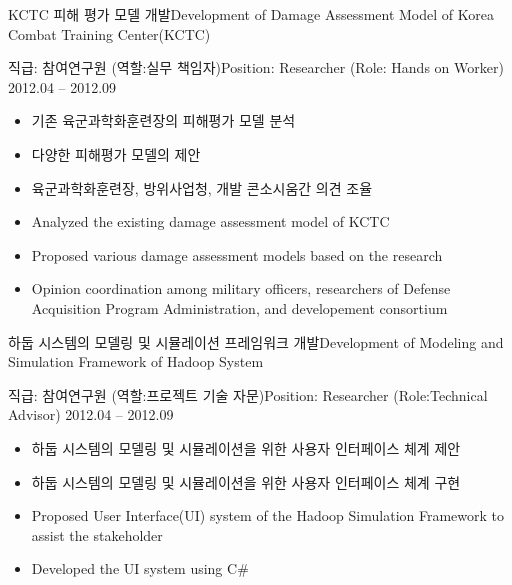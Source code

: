 \documentclass[english,representative]{resume_structure}
\begin{document}
\begin{Project}
{KCTC 피해 평가 모델 개발}{Development of Damage Assessment Model of Korea Combat Training Center(KCTC)}
{}{} 
{
\ResumeSubSection %
    {직급: 참여연구원 (역할:실무 책임자)}{Position: Researcher (Role: Hands on Worker)}
    {2012.04 -- 2012.09}
    {
      \begin{itemize}
        \item 기존 육군과학화훈련장의 피해평가 모델 분석
        \item 다양한 피해평가 모델의 제안
        \item 육군과학화훈련장, 방위사업청, 개발 콘소시움간 의견 조율
      \end{itemize}
    }
    {
      \begin{itemize}
        \item Analyzed the existing damage assessment model of KCTC
        \item Proposed various damage assessment models based on the research
        \item Opinion coordination among military officers, researchers of Defense Acquisition Program Administration, and developement consortium
      \end{itemize}
    }
}

{하둡 시스템의 모델링 및 시뮬레이션 프레임워크 개발}{Development of Modeling and Simulation Framework of Hadoop System}
{}{} 
{
\ResumeSubSection %
    {직급: 참여연구원 (역할:프로젝트 기술 자문)}{Position: Researcher (Role:Technical Advisor)}
    {2012.04 -- 2012.09}
    {
      \begin{itemize}
        \item 하둡 시스템의 모델링 및 시뮬레이션을 위한 사용자 인터페이스 체계 제안
        \item 하둡 시스템의 모델링 및 시뮬레이션을 위한 사용자 인터페이스 체계 구현
      \end{itemize}
    }
    {
      \begin{itemize}
        \item Proposed User Interface(UI) system of the Hadoop Simulation Framework to assist the stakeholder
        \item Developed the UI system using C\#
      \end{itemize}
    }
}


\end{Project}
\end{document}
